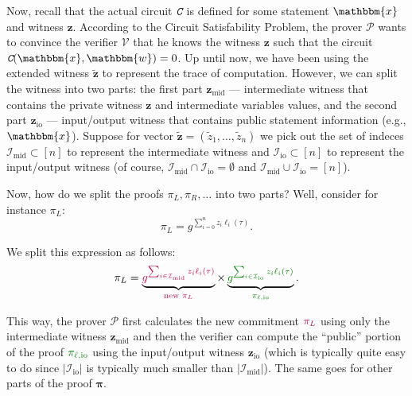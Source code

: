 \documentclass[../lecture-notes-148x210.tex]{subfiles}
\begin{document}
Now, recall that the actual circuit $\textit{\texttt{C}}$ is defined for some statement
$\mathbbm{x}$ and witness $\mathbf{z}$. According to the Circuit Satisfability
Problem, the prover $\mathcal{P}$ wants to convince the verifier $\mathcal{V}$
that he knows the witness $\mathbf{z}$ such that the circuit $\Circ(\mathbbm{x},
\mathbbm{w}) = 0$. Up until now, we have been using the extended witness
$\widetilde{\mathbf{z}}$ to represent the trace of computation. However, we can
split the witness into two parts: the first part $\mathbf{z}_{\text{mid}}$ ---
intermediate witness that contains the private witness $\mathbf{z}$ and
intermediate variables values, and the second part $\mathbf{z}_{\text{io}}$ ---
input/output witness that contains public statement information (e.g.,
$\mathbbm{x}$). Suppose for vector $\widetilde{\mathbf{z}} =
(\widetilde{z}_1,\dots,\widetilde{z}_n)$ we pick out the set of indeces
$\mathcal{I}_{\text{mid}} \subset [n]$ to represent the intermediate witness and
$\mathcal{I}_{\text{io}} \subset [n]$ to represent the input/output witness (of
course, $\mathcal{I}_{\text{mid}} \cap \mathcal{I}_{\text{io}} = \emptyset$ and
$\mathcal{I}_{\text{mid}} \cup \mathcal{I}_{\text{io}} = [n]$).

Now, how do we split the proofs $\pi_L,\pi_R,\dots$ into two parts? Well, consider for instance $\pi_L$:
\begin{equation*}
    \pi_L = g^{\sum_{i=0}^n z_i\ell_i(\tau)}.
\end{equation*}

We split this expression as follows:
\begin{equation*}
    \pi_L = \underbrace{\textcolor{purple}{g^{\sum_{i \in \mathcal{I}_{\text{mid}}} z_i\ell_i(\tau)}}}_{\textcolor{purple}{\text{new $\pi_L$}}} 
    \times 
    \underbrace{\textcolor{green!50!black}{g^{\sum_{i \in \mathcal{I}_{\text{io}}} z_i\ell_i(\tau)}}}_{\textcolor{green!50!black}{\pi_{\ell,\text{io}}}}.
\end{equation*}

This way, the prover $\mathcal{P}$ first calculates the new commitment $\textcolor{purple}{\pi_L}$ using 
only the intermediate witness $\mathbf{z}_{\text{mid}}$ and then 
the verifier can compute the ``public'' portion of the proof $\textcolor{green!50!black}{\pi_{\ell,\text{io}}}$ 
using the input/output witness $\mathbf{z}_{\text{io}}$ 
(which is typically quite easy to do since $|\mathcal{I}_{\text{io}}|$ is typically much smaller than 
$|\mathcal{I}_{\text{mid}}|$). The same goes for other parts of the proof $\boldsymbol{\pi}$.
\end{document}
